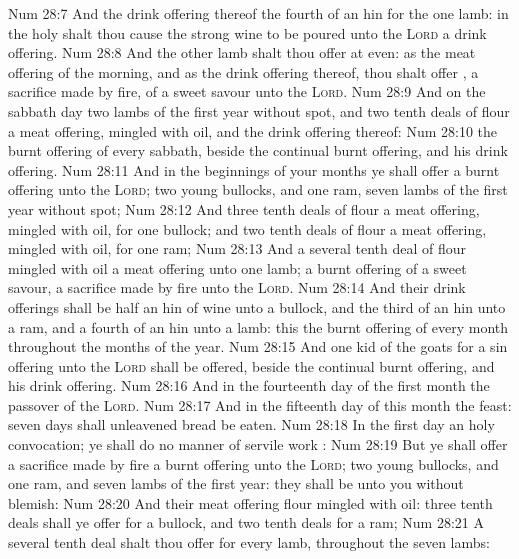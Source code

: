 \vs Num 28:7 And the drink offering thereof  the fourth  of an hin for the one lamb: in the holy  shalt thou cause the strong wine to be poured unto the \textsc{Lord}  a drink offering.
\vs Num 28:8 And the other lamb shalt thou offer at even: as the meat offering of the morning, and as the drink offering thereof, thou shalt offer , a sacrifice made by fire, of a sweet savour unto the \textsc{Lord}.
\vs Num 28:9 And on the sabbath day two lambs of the first year without spot, and two tenth deals of flour  a meat offering, mingled with oil, and the drink offering thereof:
\vs Num 28:10  the burnt offering of every sabbath, beside the continual burnt offering, and his drink offering.
\vs Num 28:11 And in the beginnings of your months ye shall offer a burnt offering unto the \textsc{Lord}; two young bullocks, and one ram, seven lambs of the first year without spot;
\vs Num 28:12 And three tenth deals of flour  a meat offering, mingled with oil, for one bullock; and two tenth deals of flour  a meat offering, mingled with oil, for one ram;
\vs Num 28:13 And a several tenth deal of flour mingled with oil  a meat offering unto one lamb;  a burnt offering of a sweet savour, a sacrifice made by fire unto the \textsc{Lord}.
\vs Num 28:14 And their drink offerings shall be half an hin of wine unto a bullock, and the third  of an hin unto a ram, and a fourth  of an hin unto a lamb: this  the burnt offering of every month throughout the months of the year.
\vs Num 28:15 And one kid of the goats for a sin offering unto the \textsc{Lord} shall be offered, beside the continual burnt offering, and his drink offering.
\vs Num 28:16 And in the fourteenth day of the first month  the passover of the \textsc{Lord}.
\vs Num 28:17 And in the fifteenth day of this month  the feast: seven days shall unleavened bread be eaten.
\vs Num 28:18 In the first day  an holy convocation; ye shall do no manner of servile work :
\vs Num 28:19 But ye shall offer a sacrifice made by fire  a burnt offering unto the \textsc{Lord}; two young bullocks, and one ram, and seven lambs of the first year: they shall be unto you without blemish:
\vs Num 28:20 And their meat offering  flour mingled with oil: three tenth deals shall ye offer for a bullock, and two tenth deals for a ram;
\vs Num 28:21 A several tenth deal shalt thou offer for every lamb, throughout the seven lambs:
